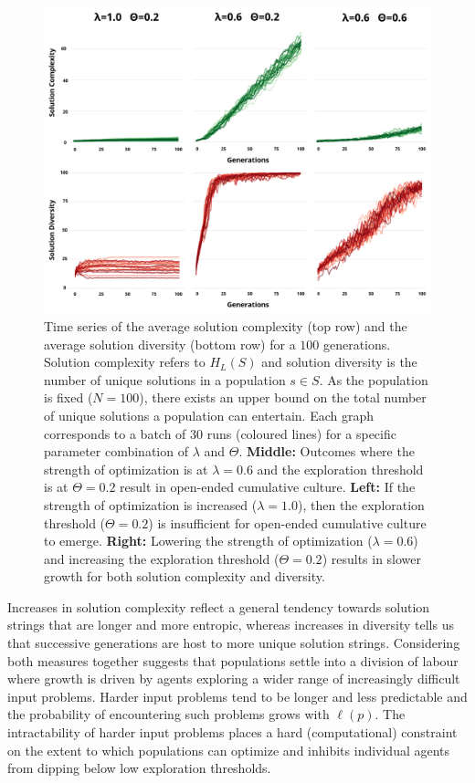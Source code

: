 \documentclass{article}
\begin{document}
\begin{figure}[H]
\begin{center}
    \includegraphics[width=\linewidth]{complexity.png}
\end{center}
    \caption{Time series of the average solution complexity (top row) and the average solution diversity (bottom row) for a $100$ generations. Solution complexity refers to $H_{L}(S)$ and solution diversity is the number of unique solutions in a population $s \in S$. As the population is fixed ($N=100$), there exists an upper bound on the total number of unique solutions a population can entertain. Each graph corresponds to a batch of 30 runs (coloured lines) for a specific parameter combination of $\lambda$ and $\Theta$. \textbf{Middle:} Outcomes where the strength of optimization is at $\lambda=0.6$ and the exploration threshold is at $\Theta=0.2$ result in open-ended cumulative culture. \textbf{Left:} If the strength of optimization is increased ($\lambda=1.0$), then the exploration threshold ($\Theta=0.2$) is insufficient for open-ended cumulative culture to emerge. \textbf{Right:} Lowering the strength of optimization ($\lambda=0.6$) and increasing the exploration threshold ($\Theta=0.2$) results in slower growth for both solution complexity and diversity.}
    \label{fig:complex}
\end{figure}

Increases in solution complexity reflect a general tendency towards solution strings that are longer and more entropic, whereas increases in diversity tells us that successive generations are host to more unique solution strings. Considering both measures together suggests that populations settle into a division of labour where growth is driven by agents exploring a wider range of increasingly difficult input problems. Harder input problems tend to be longer and less predictable and the probability of encountering such problems grows with $\ell(p)$. The intractability of harder input problems places a hard (computational) constraint on the extent to which populations can optimize and inhibits individual agents from dipping below low exploration thresholds.
\end{document}
